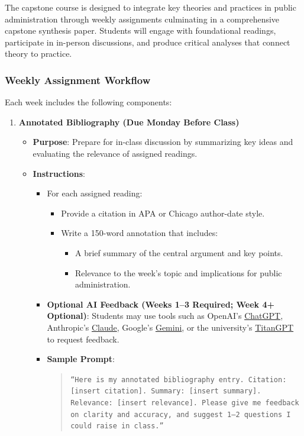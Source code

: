 \documentclass[12pt, letterpaper]{article}
\begin{document}
The capstone course is designed to integrate key theories and practices in public administration through weekly assignments culminating in a comprehensive capstone synthesis paper. Students will engage with foundational readings, participate in in-person discussions, and produce critical analyses that connect theory to practice.

\subsubsection*{Weekly Assignment Workflow}

Each week includes the following components:

\begin{enumerate}
    \item \textbf{Annotated Bibliography (Due Monday Before Class)}
    \begin{itemize}
        \item \textbf{Purpose}: Prepare for in-class discussion by summarizing key ideas and evaluating the relevance of assigned readings.
        \item \textbf{Instructions}:
        \begin{itemize}
            \item For each assigned reading:
            \begin{itemize}
                \item Provide a citation in APA or Chicago author-date style.
                \item Write a 150-word annotation that includes:
                \begin{itemize}
                    \item A brief summary of the central argument and key points.
                    \item Relevance to the week's topic and implications for public administration.
                \end{itemize}
            \end{itemize}
            \item \textbf{Optional AI Feedback (Weeks 1--3 Required; Week 4+ Optional)}: Students may use tools such as OpenAI's \href{https://chat.openai.com/}{ChatGPT}, Anthropic's \href{https://www.anthropic.com/}{Claude}, Google's \href{https://www.google.com/search/about/}{Gemini}, or the university's \href{https://titangpt.fullerton.edu/auth/jwt/login}{TitanGPT} to request feedback.  
            \item \textbf{Sample Prompt}:
            \begin{quote}
                \texttt{``Here is my annotated bibliography entry. Citation: [insert citation]. Summary: [insert summary]. Relevance: [insert relevance]. Please give me feedback on clarity and accuracy, and suggest 1--2 questions I could raise in class.''}
            \end{quote}
        \end{itemize}
    \end{itemize}


\end{enumerate}
\end{document}
